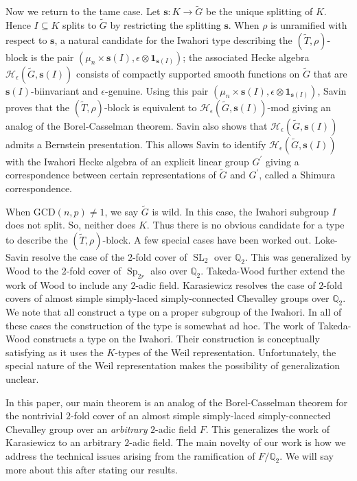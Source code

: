 \documentclass[10pt, letterpaper]{amsart}
\theoremstyle{plain}
\theoremstyle{definition}
\numberwithin{equation}{section}
\newcommand{\SL}{\operatorname{SL}}
\newcommand{\Sp}{\operatorname{Sp}}
\newcommand{\Gt}{\widetilde{G}}
\newcommand{\Tt}{\widetilde{T}}
\newcommand{\s}{\mathbf{s}}
\newcommand{\Hcal}{\mathcal{H}}
\newcommand{\one}{\mathbf{1}}
\begin{document}
Now we return to the tame case. Let $\s:K\rightarrow \Gt$ be the unique splitting of $K$. Hence $I\subseteq K$ splits to $\Gt$ by restricting the splitting $\s$. When $\rho$ is unramified with respect to $\mathbf{s}$, a natural candidate for the Iwahori type describing the $(\Tt,\rho)$-block is the pair $(\mu_{n}\times \s(I),\epsilon \otimes \one_{\s(I)})$; the associated Hecke algebra $\Hcal_{\epsilon}(\Gt, \s(I))$ consists of compactly supported smooth functions on $\Gt$ that are $\s(I)$-biinvariant and $\epsilon$-genuine. Using this pair $(\mu_{n}\times \s(I),\epsilon \otimes \one_{\s(I)})$, Savin proves that the $(\Tt,\rho)$-block is equivalent to $\Hcal_{\epsilon}(\Gt, \s(I))$-mod giving an analog of the Borel-Casselman theorem. Savin also shows that $\Hcal_{\epsilon}(\Gt, \s(I))$ admits a Bernstein presentation. This allows Savin to identify $\Hcal_{\epsilon}(\Gt, \s(I))$ with the Iwahori Hecke algebra of an explicit linear group $G^{\prime}$ giving a correspondence between certain representations of $\Gt$ and $G^{\prime}$, called a Shimura correspondence.

When $\mathrm{GCD}(n,p)\neq 1$, we say $\Gt$ is wild. In this case, the Iwahori subgroup $I$ does not split. So, neither does $K$. Thus there is no obvious candidate for a type to describe the $(\Tt,\rho)$-block. A few special cases have been worked out. Loke-Savin \cite{LS10a} resolve the case of the $2$-fold cover of $\SL_{2}$ over $\mathbb{Q}_{2}$. This was generalized by Wood \cite{Wood} to the $2$-fold cover of $\Sp_{2r}$ also over $\mathbb{Q}_{2}$. Takeda-Wood \cite{Takeda_Wood} further extend the work of Wood to include any $2$-adic field. Karasiewicz \cite{Karasiewicz} resolves the case of $2$-fold covers of almost simple simply-laced simply-connected Chevalley groups over $\mathbb{Q}_{2}$. We note that \cite{Wood,LS10a,Karasiewicz} all construct a type on a proper subgroup of the Iwahori. In all of these cases the construction of the type is somewhat ad hoc. The work of Takeda-Wood \cite{Takeda_Wood} constructs a type on the Iwahori. Their construction is conceptually satisfying as it uses the $K$-types of the Weil representation. Unfortunately, the special nature of the Weil representation makes the possibility of generalization unclear. %

In this paper, our main theorem is an analog of the Borel-Casselman theorem for the nontrivial $2$-fold cover of an almost simple simply-laced simply-connected Chevalley group over an \textit{arbitrary} $2$-adic field $F$. This generalizes the work of Karasiewicz \cite{Karasiewicz} to an arbitrary $2$-adic field. The main novelty of our work is how we address the technical issues arising from the ramification of $F/\mathbb{Q}_{2}$. We will say more about this after stating our results.
\end{document}
